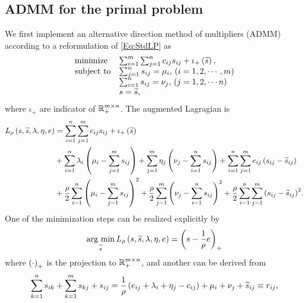 \documentclass[english]{pkupaper}
\begin{document}
\subsection{ADMM for the primal problem}

We first implement an alternative direction method of multipliers (ADMM) according to a reformulation of \eqref{Eq:StdLP} as
\begin{equation} \label{Eq:ADMMPrimal}
\begin{array}{ll}
\mathrel{\text{{minimize}}} & \sum_{ {i} = {1} }^{m}{\sum_{ {j} = {1} }^{n}{ c_{ i j } s_{ i j } }} + \iota_+ \left( \widetilde{s} \right), \\
\mathrel{\text{{subject to}}} & \sum_{ {j} = {1} }^{n}{s_{ i j }} = \mu_i, \mathbin{}\left(  i = 1, 2, \cdots, m  \right) \\
& \sum_{ {i} = {1} }^{n}{s_{ i j }} = \nu_j, \mathbin{}\left(  j = 1, 2, \cdots n  \right) \\
& s = \widetilde{s},
\end{array}
\end{equation}
where $\iota_+$ are indicator of $ \mathbb{R}^{ m \times n }_+ $. The augmented Lagragian is
\begin{equation}
\begin{aligned}
L_{\rho} \left(  s, \widetilde{s}, \lambda, \eta, e  \right) &= \sum_{ {i} = {1} }^{n}{\sum_{ {j} = {1} }^{m}{ c_{ i j } s_{ i j } }} + \iota_+ \left( \widetilde{s} \right) \\
&+ \sum_{ {i} = {1} }^{n}{ \lambda_i \left(  \mu_i - \sum_{ {j} = {1} }^{m}{s_{ i j }}  \right) } + \sum_{ {j} = {1} }^{m}{ \eta_j \left(  \nu_j - \sum_{ {i} = {1} }^{n}{s_{ i j }}  \right) } + \sum_{ {i} = {1} }^{n}{\sum_{ {j} = {1} }^{m}{ e_{ i j } \left(  s_{ i j } - \widetilde{s}_{ i j }  \right) }} \\
&+ \frac{\rho}{2} \sum_{ {i} = {1} }^{n}{\left(  \mu_i - \sum_{ {j} = {1} }^{m}{s_{ i j }}  \right)^2} + \frac{\rho}{2} \sum_{ {j} = {1} }^{m}{\left(  \nu_j - \sum_{ {i} = {1} }^{n}{s_{ i j }}  \right)^2} + \frac{\rho}{2} \sum_{ {i} = {1} }^{n}{\sum_{ {j} = {1} }^{m}{\left(  s_{ i j } - \widetilde{s}_{ i j }  \right)^2}}. \\
\end{aligned}
\end{equation}
One of the minimization steps can be realized explicitly by
\begin{equation} \label{Eq:ProjStep}
\operatorname*{\arg\,\min}_{\widetilde{s}} L_{\rho} \left(  s, \widetilde{s}, \lambda, \eta, e  \right) = \left(  s - \frac{1}{\rho} e  \right)_+
\end{equation}
where $\left( \cdot \right)_+$ is the projection to $ \mathbb{R}^{ m \times n }_+ $, and another can be derived from
\begin{gather} \label{Eq:LinSys}
\sum_{ {k} = {1} }^{n}{s_{ i k }} + \sum_{ {k} = {1} }^{m}{s_{ k j }} + s_{ i j } = \frac{1}{\rho} \left(  e_{ i j } + \lambda_i + \eta_j - c_{ i j }  \right) + \mu_i + \nu_j + \widetilde{s}_{ i j } \equiv r_{ i j },
\end{gather}
\end{document}
